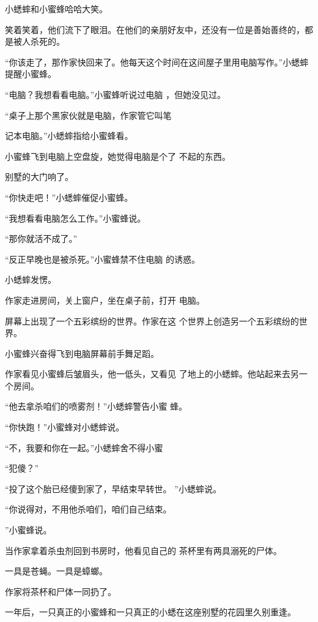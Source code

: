 \documentclass{article}
\begin{document}
小蟋蟀和小蜜蜂哈哈大笑。 

笑着笑着，他们流下了眼泪。在他们的亲朋好友中，还没有一位是善始善终的，都是被人杀死的。

“你该走了，那作家快回来了。他每天这个时间在这间屋子里用电脑写作。”小蟋蟀提醒小蜜蜂。

“电脑？我想看看电脑。”小蜜蜂听说过电脑
，但她没见过。 

“桌子上那个黑家伙就是电脑，作家管它叫笔
\newpage

记本电脑。”小蟋蟀指给小蜜蜂看。 

小蜜蜂飞到电脑上空盘旋，她觉得电脑是个了
不起的东西。 


别墅的大门响了。 


“你快走吧！”小蟋蟀催促小蜜蜂。 


“我想看看电脑怎么工作。”小蜜蜂说。 


“那你就活不成了。” 

“反正早晚也是被杀死。”小蜜蜂禁不住电脑
的诱惑。 


小蟋蟀发愣。 

作家走进房间，关上窗户，坐在桌子前，打开
电脑。 

\newpage

屏幕上出现了一个五彩缤纷的世界。作家在这
个世界上创造另一个五彩缤纷的世界。 


小蜜蜂兴奋得飞到电脑屏幕前手舞足蹈。 

作家看见小蜜蜂后皱眉头，他一低头，又看见
了地上的小蟋蟀。他站起来去另一个房间。 

“他去拿杀咱们的喷雾剂！”小蟋蟀警告小蜜
蜂。 


“你快跑！”小蜜蜂对小蟋蟀说。 

“不，我要和你在一起。”小蟋蟀舍不得小蜜


“犯傻？” 

“投了这个胎已经傻到家了，早结束早转世。
”小蟋蟀说。 

“你说得对，不用他杀咱们，咱们自己结束。
\newpage

”小蜜蜂说。 

当作家拿着杀虫剂回到书房时，他看见自己的
茶杯里有两具溺死的尸体。 


一具是苍蝇。一具是蟑螂。 


作家将茶杯和尸体一同扔了。 

一年后，一只真正的小蜜蜂和一只真正的小蟋在这座别墅的花园里久别重逢。
\end{document}

